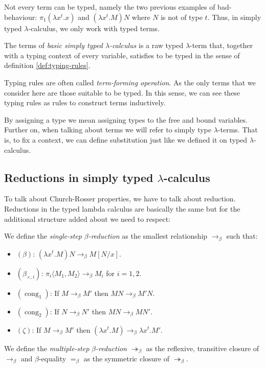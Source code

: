 \begin{remark}
  Not every term can be typed, namely the two previous examples of bad-behaviour: $\pi_1(\lambda x^t. x)$ and $(\lambda x^t.M)N$ where $N$ is not of type $t$. Thus, in simply typed $\lambda$-calculus, we only work with typed terms.
\end{remark}

\begin{definition}
  The terms of \emph{basic simply typed $\lambda$-calculus} is a raw typed $\lambda$-term that, together with a typing context of every variable, satisfies to be typed in the sense of definition \ref{def:typing-rules}.
\end{definition}
\begin{remark}
  Typing rules are often called \emph{term-forming operation}. As the only terms that we consider here are those suitable to be typed. In this sense,  we can see these typing rules as rules to construct terms inductively.
\end{remark}

By assigning a type we mean assigning types to the free and bound variables. Further on, when talking about terms we will refer to simply type $\lambda$-terms. That is, to fix a context, we can define substitution just like we defined it on typed $\lambda$-calculus.


\subsection{Reductions in simply typed $\lambda$-calculus}

To talk about Church-Rosser properties, we have to talk about reduction. Reductions in the typed lambda calculus are basically the same but for the additional structure added about we need to respect: 

\begin{definition}
  We define the \emph{single-step} $\beta$\emph{-reduction} as the smallest relationship $\to_\beta$ such that:
  \begin{itemize}
  \item[]$(\beta)$: $ (\lambda x^t.M)N \to_\beta M[N/x]$.\\
  \item[]$(\beta_{\times,i})$: $\pi_i\langle M_1,M_2\rangle \to_\beta M_i$ for $i=1,2$.\\
  \item[]$(\operatorname{cong}_1)$: If $ M \to_\beta M'$ then $MN \to_\beta M'N$.\\
  \item[]$(\operatorname{cong}_2)$: If $ N \to_\beta N'$ then $ MN \to_\beta MN'$.\\
  \item[]$(\zeta)$: If $M\to_\beta M'$ then $(\lambda x^t.M) \to_\beta \lambda x^t.M'$.\\
  \end{itemize}
  We define the \emph{multiple-step} $\beta$\emph{-reduction} $\twoheadrightarrow_\beta$ as the reflexive, transitive closure of $\to_\beta$ and $\beta$-equality $=_\beta$ as the symmetric closure of $\twoheadrightarrow_\beta$.
\end{definition}

